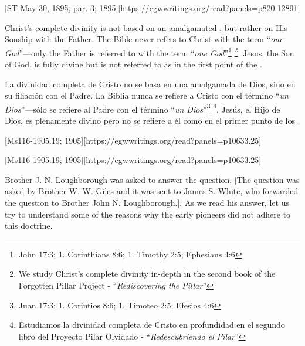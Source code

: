 [ST May 30, 1895, par. 3; 1895][https://egwwritings.org/read?panels=p820.12891]


Christ's complete divinity is not based on an amalgamated , but rather on His Sonship with the Father. The Bible never refers to Christ with the term “\textit{one God}”—only the Father is referred to with the term “\textit{one God}”\footnote{John 17:3; 1. Corinthians 8:6; 1. Timothy 2:5; Ephesians 4:6} \footnote{We study Christ’s complete divinity in-depth  in the second book of the Forgotten Pillar Project - “\textit{Rediscovering the Pillar}”}. Jesus, the Son of God, is fully divine but is not referred to as  in the first point of the .


La divinidad completa de Cristo no se basa en una  amalgamada de Dios, sino en su filiación con el Padre. La Biblia nunca se refiere a Cristo con el término “\textit{un Dios}”—sólo se refiere al Padre con el término “\textit{un Dios}”\footnote{Juan 17:3; 1. Corintios 8:6; 1. Timoteo 2:5; Efesios 4:6} \footnote{Estudiamos la divinidad completa de Cristo en profundidad en el segundo libro del Proyecto Pilar Olvidado - “\textit{Redescubriendo el Pilar}”}. Jesús, el Hijo de Dios, es plenamente divino pero no se refiere a él como  en el primer punto de los .


[Ms116-1905.19; 1905][https://egwwritings.org/read?panels=p10633.25]


[Ms116-1905.19; 1905][https://egwwritings.org/read?panels=p10633.25]


Brother J. N. Loughborough was asked to answer the question, [The question was asked by Brother W. W. Giles and it was sent to James S. White, who forwarded the question to Brother John N. Loughborough.]. As we read his answer, let us try to understand some of the reasons why the early pioneers did not adhere to this doctrine.


